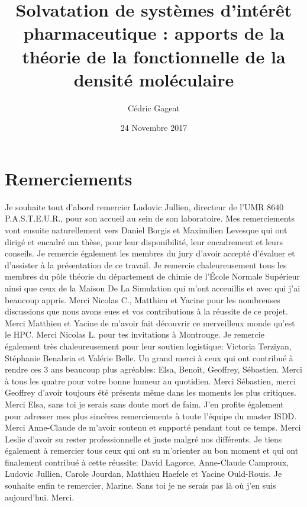 \documentclass{bredele}
\title{Solvatation de systèmes d’intérêt pharmaceutique : apports de la théorie de la fonctionnelle de la densité moléculaire}
\author{Cédric Gageat}
\institute{l'\'Ecole Normale Supérieure}
\date{24 Novembre 2017}
\begin{document}
\frontmatter

\tikzexternaldisable
\maketitle{}
\tikzexternalenable

\cleardoublepage

\chapter*{Remerciements}

Je souhaite tout d'abord remercier Ludovic Jullien, directeur de l'UMR 8640\\P.A.S.T.E.U.R., pour son accueil au sein de son laboratoire.
\medbreak
Mes remerciements vont ensuite naturellement vers Daniel Borgis et Maximilien Levesque qui ont dirigé et encadré ma thèse, pour leur disponibilité, leur encadrement et leurs conseils.
\medbreak
Je remercie également les membres du jury d’avoir accepté d'évaluer et d’assister à la présentation de ce travail.
\medbreak
Je remercie chaleureusement tous les membres du pôle théorie du département de chimie de l'\'Ecole Normale Supérieur ainsi que ceux de la Maison De La Simulation qui m'ont acceuillis et avec qui j'ai beaucoup appris. Merci Nicolas C., Matthieu et Yacine pour les nombreuses discussions que nous avons eues et vos contributions à la réussite de ce projet. Merci Matthieu et Yacine de m'avoir fait découvrir ce merveilleux monde qu'est le HPC. Merci Nicolas L. pour tes invitations à Montrouge. Je remercie également très chaleureusement pour leur soutien logistique: Victoria Terziyan, Stéphanie Benabria et Valérie Belle.
\medbreak
Un grand merci à ceux qui ont contribué à rendre ces 3 ans beaucoup plus agréables: Elsa, Beno\^it, Geoffrey, Sébastien. Merci à tous les quatre pour votre bonne humeur au quotidien. Merci Sébastien, merci Geoffrey d'avoir toujours été présents même dans les moments les plus critiques. Merci Elsa, sans toi je serais sans doute mort de faim.
\medbreak
J'en profite également pour adresser mes plus sincères remerciements à toute l'équipe du master ISDD. Merci Anne-Claude de m'avoir soutenu et supporté pendant tout ce temps. Merci Leslie d'avoir su rester professionnelle et juste malgré nos différents.
\medbreak
Je tiens également à remercier tous ceux qui ont su m'orienter au bon moment et qui ont finalement contribué à cette réussite: David Lagorce, Anne-Claude Camproux, Ludovic Jullien, Carole Jourdan, Matthieu Haefele et Yacine Ould-Rouis.
\medbreak
Je souhaite enfin te remercier, Marine. Sans toi je ne serais pas là o\`u j'en suis aujourd'hui. Merci.
\end{document}
